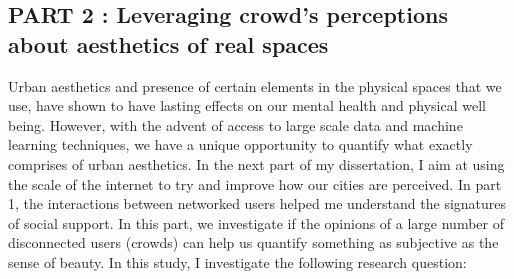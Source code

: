 \subsection{PART 2 : Leveraging crowd's perceptions about aesthetics of real spaces}
Urban aesthetics and presence of certain elements in the physical spaces that we use, have shown to have lasting effects on our mental health\cite{seresinhe2017using} and physical well being\cite{ball2001perceived,giles2005increasing}. However, with the advent of access to large scale data and machine learning techniques, we have a unique opportunity to quantify what exactly comprises of urban aesthetics.
In the next part of my dissertation, I aim at using the scale of the internet to try and improve how our cities are perceived. In part 1, the interactions between networked users helped me understand the signatures of social support. In this part, we investigate if the opinions of a large number of disconnected users (crowds) can help us quantify something as subjective as the sense of beauty. In this study, I investigate the following research question: 


\noindent{}
\noindent{}
\noindent{}
\vspace{0.5cm}

